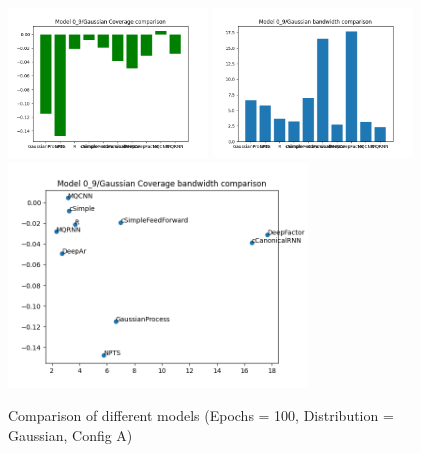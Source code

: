 \documentclass[a4paper, 12pt]{article}
\begin{document}
\begin{figure}[!h]
    \centering
    \includegraphics[width=200px]{plots/hist/a/model/0_9/Gaussian/Coverage.png}
    \includegraphics[width=200px]{plots/hist/a/model/0_9/Gaussian/bandwidth.png}
    \includegraphics[width=300px]{plots/scatter/a/model/0_9/Gaussian/Coverage_bandwidth.png}
    \caption{Comparison of different models (Epochs = 100, Distribution = Gaussian, Config A)}
    \label{fig:comp_mqcnn}
\end{figure}
\end{document}
